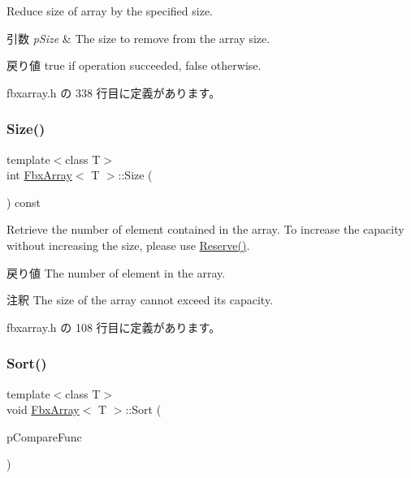Reduce size of array by the specified size. 
\begin{DoxyParams}{引数}
{\em p\+Size} & The size to remove from the array size. \\
\hline
\end{DoxyParams}
\begin{DoxyReturn}{戻り値}
{\ttfamily true} if operation succeeded, {\ttfamily false} otherwise. 
\end{DoxyReturn}


 fbxarray.\+h の 338 行目に定義があります。

\mbox{\label{class_fbx_array_aa76a0ceaf4b13a2acec7c0cdd1c08362}} 
\subsubsection{\texorpdfstring{Size()}{Size()}}
{\footnotesize\ttfamily template$<$class T$>$ \\
int \hyperlink{class_fbx_array}{Fbx\+Array}$<$ T $>$\+::Size (\begin{DoxyParamCaption}{ }\end{DoxyParamCaption}) const\hspace{0.3cm}{\ttfamily [inline]}}

Retrieve the number of element contained in the array. To increase the capacity without increasing the size, please use \hyperlink{class_fbx_array_a7d5a64be591ee59708079c2c5fe0dd1b}{Reserve()}. \begin{DoxyReturn}{戻り値}
The number of element in the array. 
\end{DoxyReturn}
\begin{DoxyRemark}{注釈}
The size of the array cannot exceed its capacity. 
\end{DoxyRemark}


 fbxarray.\+h の 108 行目に定義があります。

\mbox{\label{class_fbx_array_ab4bd11584ad0175022c04d817366ecba}} 
\subsubsection{\texorpdfstring{Sort()}{Sort()}}
{\footnotesize\ttfamily template$<$class T$>$ \\
void \hyperlink{class_fbx_array}{Fbx\+Array}$<$ T $>$\+::Sort (\begin{DoxyParamCaption}\item[{\hyperlink{class_fbx_array_a3f251a5b7314e26facb298dcf3856557}{Compare\+Func}}]{p\+Compare\+Func }\end{DoxyParamCaption})\hspace{0.3cm}{\ttfamily [inline]}}

